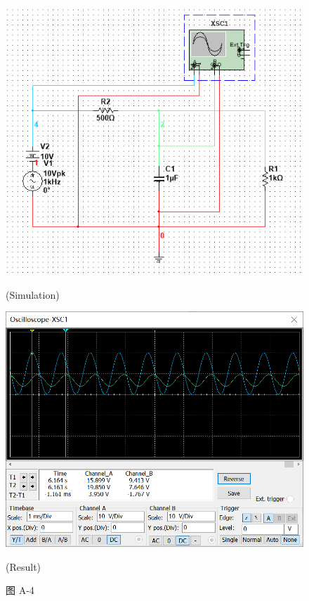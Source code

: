 \documentclass[hyperref, UTF8]{ctexart}
\begin{document}
\begin{figure}[!htb]
\centering
\begin{minipage}[t]{0.354\textwidth}
\centering
\includegraphics[width=1\textwidth]{pA-4-sim.png}
\caption*{(Simulation)}
\end{minipage}
\begin{minipage}[t]{0.550\textwidth}
\centering
\includegraphics[width=1\textwidth]{pA-4-res.png}
\caption*{(Result)}
\end{minipage}
\caption*{图 A-4}
\end{figure}
\end{document}
